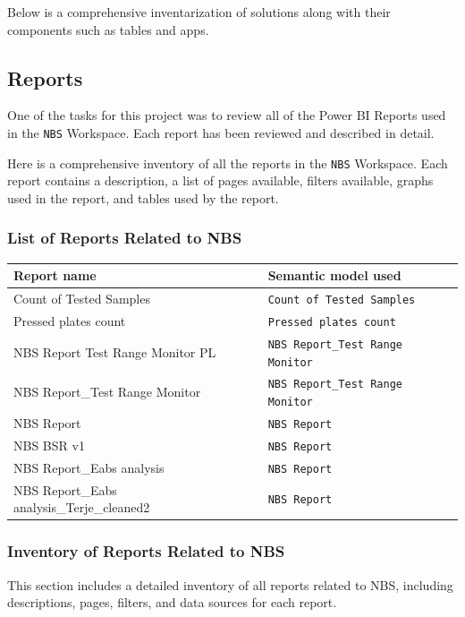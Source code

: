 Below is a comprehensive inventarization of solutions along with their components such as tables and apps.



\subsection{Reports}

One of the tasks for this project was to review all of the Power BI Reports used in the \texttt{NBS} Workspace. Each report has been reviewed and described in detail.

Here is a comprehensive inventory of all the reports in the \texttt{NBS} Workspace. Each report contains a description, a list of pages available, filters available, graphs used in the report, and tables used by the report.

\subsubsection{List of Reports Related to NBS}

\begin{small}
	\begin{tabularx}{\textwidth}{l|l}
		\textbf{Report name} & \textbf{Semantic model used} \\
		\hline
		Count of Tested Samples & \texttt{Count of Tested Samples} \\
		Pressed plates count & \texttt{Pressed plates count} \\
		NBS Report Test Range Monitor PL & \texttt{NBS Report\_Test Range Monitor} \\
		NBS Report\_Test Range Monitor & \texttt{NBS Report\_Test Range Monitor} \\
		NBS Report & \texttt{NBS Report} \\
		NBS BSR v1 & \texttt{NBS Report} \\
		NBS Report\_Eabs analysis & \texttt{NBS Report} \\
		NBS Report\_Eabs analysis\_Terje\_cleaned2 & \texttt{NBS Report} \\
	\end{tabularx}
\end{small}

\subsubsection{Inventory of Reports Related to NBS}

This section includes a detailed inventory of all reports related to NBS, including descriptions, pages, filters, and data sources for each report.

